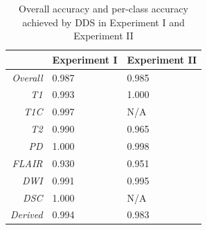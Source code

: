 \begin{table}[htbp]
 \centering
  \begin{tabular}{rC{4cm}C{3cm}}
      \toprule
& \textbf{Experiment I} & \textbf{Experiment II}\\
    \midrule
  \textit{Overall}    & 0.987 & 0.985\\
  \textit{\gls{T1}}        & 0.993 & 1.000\\
  \textit{\gls{T1C}}       & 0.997 & N/A\\
  \textit{\gls{T2}}        & 0.990 & 0.965\\
  \textit{\gls{PD}}        & 1.000 & 0.998\\
  \textit{\gls{FLAIR}}  & 0.930 & 0.951\\
  \textit{\gls{DWI}}        & 0.991 & 0.995\\
  \textit{\gls{DSC}}    & 1.000 & N/A\\
  \textit{Derived}    & 0.994 & 0.983\\
  \bottomrule
  \end{tabular}
  \caption{Overall accuracy and per-class accuracy achieved by \gls{DDS} in Experiment I and Experiment II}\label{tab:seqacc}

\end{table}


